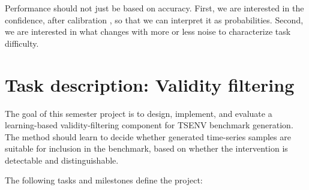 \documentclass[11pt]{article}
\begin{document}
Performance should not just be based on accuracy. 
First, we are interested in the confidence, after calibration \cite{guo2017calibration}, so that we can interpret it as probabilities.
Second, we are interested in what changes with more or less noise to characterize task difficulty.


\section*{Task description: Validity filtering}

The goal of this semester project is to design, implement, and evaluate a learning-based validity-filtering component for TSENV benchmark generation. The method should learn to decide whether generated time-series samples are suitable for inclusion in the benchmark, based on whether the intervention is detectable and distinguishable.

The following tasks and milestones define the project:
\end{document}
